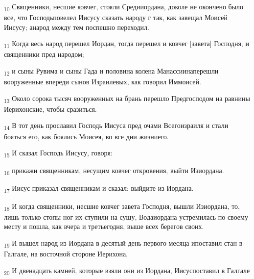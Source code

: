 \begin{tcolorbox}
\textsubscript{10} Священники, несшие ковчег, стояли Средииордана, доколе не окончено было все, что Господьповелел Иисусу сказать народу г так, как завещал Моисей Иисусу; анарод между тем поспешно переходил.
\end{tcolorbox}
\begin{tcolorbox}
\textsubscript{11} Когда весь народ перешел Иордан, тогда перешел и ковчег [завета] Господня, и священники пред народом;
\end{tcolorbox}
\begin{tcolorbox}
\textsubscript{12} и сыны Рувима и сыны Гада и половина колена Манассиинаперешли вооруженные впереди сынов Израилевых, как говорил Иммоисей.
\end{tcolorbox}
\begin{tcolorbox}
\textsubscript{13} Около сорока тысяч вооруженных на брань перешло Предгосподом на равнины Иерихонские, чтобы сразиться.
\end{tcolorbox}
\begin{tcolorbox}
\textsubscript{14} В тот день прославил Господь Иисуса пред очами Всегоизраиля и стали бояться его, как боялись Моисея, во все дни жизниего.
\end{tcolorbox}
\begin{tcolorbox}
\textsubscript{15} И сказал Господь Иисусу, говоря:
\end{tcolorbox}
\begin{tcolorbox}
\textsubscript{16} прикажи священникам, несущим ковчег откровения, выйти Изиордана.
\end{tcolorbox}
\begin{tcolorbox}
\textsubscript{17} Иисус приказал священникам и сказал: выйдите из Иордана.
\end{tcolorbox}
\begin{tcolorbox}
\textsubscript{18} И когда священники, несшие ковчег завета Господня, вышли Изиордана, то, лишь только стопы ног их ступили на сушу, Водаиордана устремилась по своему месту и пошла, как вчера и третьегодня, выше всех берегов своих.
\end{tcolorbox}
\begin{tcolorbox}
\textsubscript{19} И вышел народ из Иордана в десятый день первого месяца ипоставил стан в Галгале, на восточной стороне Иерихона.
\end{tcolorbox}
\begin{tcolorbox}
\textsubscript{20} И двенадцать камней, которые взяли они из Иордана, Иисуспоставил в Галгале
\end{tcolorbox}
